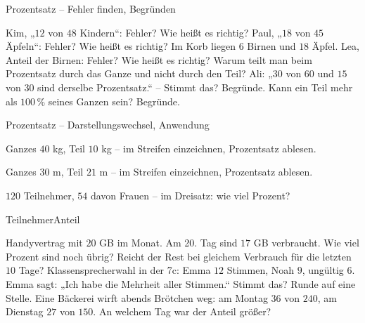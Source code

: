 \begin{aufgabe}{Prozentsatz – Fehler finden, Begründen}
\begin{teile}
\teil Kim, „$12$ von $48$ Kindern“:  Fehler? Wie heißt es richtig?
\teil Paul, „$18$ von $45$ Äpfeln“:  Fehler? Wie heißt es richtig?
\teil Im Korb liegen $6$ Birnen und $18$ Äpfel. Lea, Anteil der Birnen:  Fehler? Wie heißt es richtig?
\teil Warum teilt man beim Prozentsatz durch das Ganze und nicht durch den Teil?
\teil Ali: „$30$ von $60$ und $15$ von $30$ sind derselbe Prozentsatz.“ – Stimmt das? Begründe.
\teil Kann ein Teil mehr als $100\,\%$ seines Ganzen sein? Begründe.
\end{teile}
\end{aufgabe}

\begin{aufgabe}{Prozentsatz – Darstellungswechsel, Anwendung}
\begin{teile}
\teil Ganzes $40$ kg, Teil $10$ kg – im Streifen einzeichnen, Prozentsatz ablesen.

\streifenleer[4]
\leerfeld[\%]
\teil Ganzes $30$ m, Teil $21$ m – im Streifen einzeichnen, Prozentsatz ablesen.

\streifenleer
\leerfeld[\%]
\teil $120$ Teilnehmer, $54$ davon Frauen – im Dreisatz: wie viel Prozent?

\begin{dreisatz}{Teilnehmer}{Anteil}\dsp{\phantom{:0}}{\phantom{:0}}\dsp{\phantom{:0}}{\phantom{:0}}\end{dreisatz}
\teil Handyvertrag mit $20$ GB im Monat. Am 20. Tag sind $17$ GB verbraucht. Wie viel Prozent sind noch übrig? Reicht der Rest bei gleichem Verbrauch für die letzten $10$ Tage?
\teil Klassensprecherwahl in der 7c: Emma $12$ Stimmen, Noah $9$, ungültig $6$. Emma sagt: „Ich habe die Mehrheit aller Stimmen.“ Stimmt das? Runde auf eine Stelle.
\teil Eine Bäckerei wirft abends Brötchen weg: am Montag $36$ von $240$, am Dienstag $27$ von $150$. An welchem Tag war der Anteil größer?
\end{teile}
\end{aufgabe}
